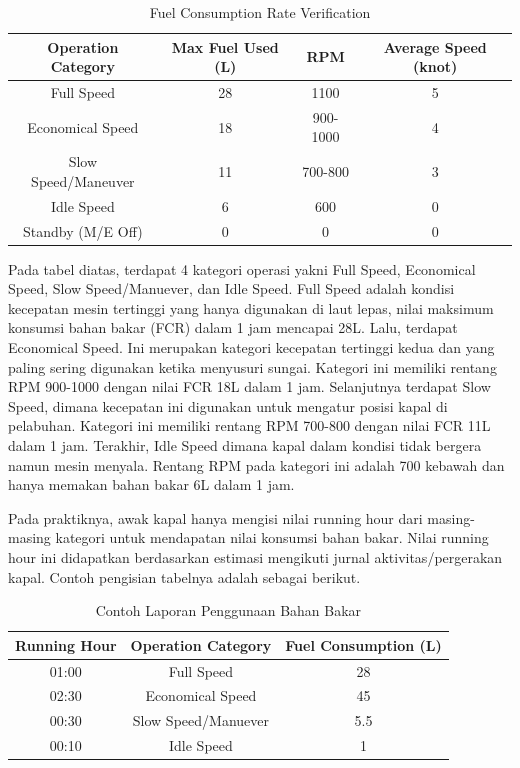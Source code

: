 \begin{table}[!h]
    \centering
     \begin{tabular}{c c c c} 
        \toprule
        Operation Category & 
        Max Fuel Used (L) & 
        RPM & 
        Average Speed (knot) \\ [0.5ex] 
        \midrule
        Full Speed          & 28    & 1100      & 5 \\  
        Economical Speed    & 18    & 900-1000  & 4 \\  
        Slow Speed/Maneuver & 11    & 700-800   & 3 \\  
        Idle Speed          & 6     & 600       & 0 \\  
        Standby (M/E Off)   & 0     & 0         & 0 \\ [1ex] 
        \bottomrule
     \end{tabular}
     \caption{Fuel Consumption Rate Verification}
     \label{tab:fcrv}
\end{table}

Pada tabel diatas, terdapat 4 kategori operasi yakni Full Speed, Economical Speed, Slow Speed/Manuever, dan Idle Speed. Full Speed adalah kondisi kecepatan mesin tertinggi yang hanya digunakan di laut lepas, nilai maksimum konsumsi bahan bakar (FCR) dalam 1 jam mencapai 28L. Lalu, terdapat Economical Speed. Ini merupakan kategori kecepatan tertinggi kedua dan yang paling sering digunakan ketika menyusuri sungai. Kategori ini memiliki rentang RPM 900-1000 dengan nilai FCR 18L dalam 1 jam. Selanjutnya terdapat Slow Speed, dimana kecepatan ini digunakan untuk mengatur posisi kapal di pelabuhan. Kategori ini memiliki rentang RPM 700-800 dengan nilai FCR 11L dalam 1 jam. Terakhir, Idle Speed dimana kapal dalam kondisi tidak bergera namun mesin menyala. Rentang RPM pada kategori ini adalah 700 kebawah dan hanya memakan bahan bakar 6L dalam 1 jam.

Pada praktiknya, awak kapal hanya mengisi nilai running hour dari masing-masing kategori untuk mendapatan nilai konsumsi bahan bakar. Nilai running hour ini didapatkan berdasarkan estimasi mengikuti jurnal aktivitas/pergerakan kapal. Contoh pengisian tabelnya adalah sebagai berikut.


\begin{table}[!h]
    \centering
     \begin{tabular}{c c c} 
        \toprule
        Running Hour & 
        Operation Category & 
        Fuel Consumption (L) \\ [0.5ex] 
        \midrule
        01:00   & Full Speed            & 28    \\  
        02:30   & Economical Speed      & 45    \\  
        00:30   & Slow Speed/Manuever   & 5.5   \\  
        00:10   & Idle Speed            & 1     \\ [1ex] 
        \bottomrule
     \end{tabular}
     \caption{Contoh Laporan Penggunaan Bahan Bakar}
     \label{tab:fc-report-example}
\end{table}

